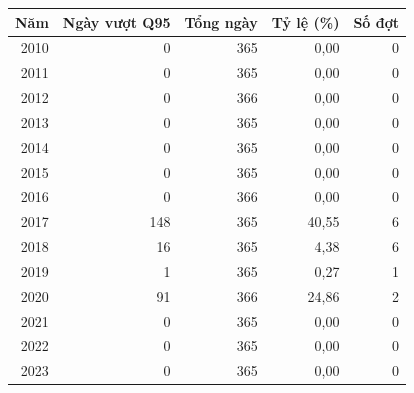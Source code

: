 \begin{tabular}{rrrrr}
\toprule
Năm & Ngày vượt Q95 & Tổng ngày & Tỷ lệ (\%) & Số đợt \\
\midrule
2010 & 0 & 365 & 0{,}00 & 0 \\
2011 & 0 & 365 & 0{,}00 & 0 \\
2012 & 0 & 366 & 0{,}00 & 0 \\
2013 & 0 & 365 & 0{,}00 & 0 \\
2014 & 0 & 365 & 0{,}00 & 0 \\
2015 & 0 & 365 & 0{,}00 & 0 \\
2016 & 0 & 366 & 0{,}00 & 0 \\
2017 & 148 & 365 & 40{,}55 & 6 \\
2018 & 16 & 365 & 4{,}38 & 6 \\
2019 & 1 & 365 & 0{,}27 & 1 \\
2020 & 91 & 366 & 24{,}86 & 2 \\
2021 & 0 & 365 & 0{,}00 & 0 \\
2022 & 0 & 365 & 0{,}00 & 0 \\
2023 & 0 & 365 & 0{,}00 & 0 \\
\bottomrule
\end{tabular}
